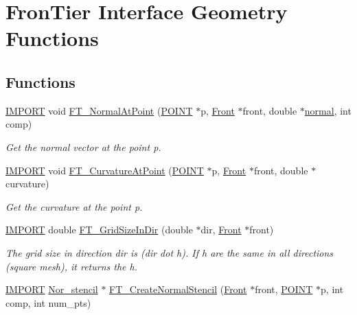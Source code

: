 \hypertarget{group___g_e_o_m_e_t_r_y}{}\section{Fron\+Tier Interface Geometry Functions}
\label{group___g_e_o_m_e_t_r_y}
\subsection*{Functions}
\begin{DoxyCompactItemize}
\item 
\hyperlink{cdecs_8h_a773175d74e73776d69c3e538f17de1ee}{I\+M\+P\+O\+RT} void \hyperlink{group___g_e_o_m_e_t_r_y_ga062c15ef32cddf4e3afb55253a3b8cd1}{F\+T\+\_\+\+Normal\+At\+Point} (\hyperlink{int_8h_a3a87c5c9d0146e30a4bf720f701e5a63}{P\+O\+I\+NT} $\ast$p, \hyperlink{fdecs_8h_ac32202b798f848095c489cfd04c4ca5f}{Front} $\ast$front, double $\ast$\hyperlink{fuserhooks_8c_a92beb80674cd0d86b6bcad12c062da8f}{normal}, int comp)
\begin{DoxyCompactList}\small\item\em Get the normal vector at the point p. \end{DoxyCompactList}\item 
\hyperlink{cdecs_8h_a773175d74e73776d69c3e538f17de1ee}{I\+M\+P\+O\+RT} void \hyperlink{group___g_e_o_m_e_t_r_y_ga2a51e60553765389dc0450e69262c6e5}{F\+T\+\_\+\+Curvature\+At\+Point} (\hyperlink{int_8h_a3a87c5c9d0146e30a4bf720f701e5a63}{P\+O\+I\+NT} $\ast$p, \hyperlink{fdecs_8h_ac32202b798f848095c489cfd04c4ca5f}{Front} $\ast$front, double $\ast$curvature)
\begin{DoxyCompactList}\small\item\em Get the curvature at the point p. \end{DoxyCompactList}\item 
\hyperlink{cdecs_8h_a773175d74e73776d69c3e538f17de1ee}{I\+M\+P\+O\+RT} double \hyperlink{group___g_e_o_m_e_t_r_y_gaf8d4ea1b2375af651d0e98da238eb418}{F\+T\+\_\+\+Grid\+Size\+In\+Dir} (double $\ast$dir, \hyperlink{fdecs_8h_ac32202b798f848095c489cfd04c4ca5f}{Front} $\ast$front)
\begin{DoxyCompactList}\small\item\em The grid size in direction dir is (dir dot h). If h are the same in all directions (square mesh), it returns the h. \end{DoxyCompactList}\item 
\hyperlink{cdecs_8h_a773175d74e73776d69c3e538f17de1ee}{I\+M\+P\+O\+RT} \hyperlink{fdecs_8h_a12a7b755de9f809f15bb18c3212eee18}{Nor\+\_\+stencil} $\ast$ \hyperlink{group___g_e_o_m_e_t_r_y_ga2154d670e36c43759fa37724a3890d96}{F\+T\+\_\+\+Create\+Normal\+Stencil} (\hyperlink{fdecs_8h_ac32202b798f848095c489cfd04c4ca5f}{Front} $\ast$front, \hyperlink{int_8h_a3a87c5c9d0146e30a4bf720f701e5a63}{P\+O\+I\+NT} $\ast$p, int comp, int num\+\_\+pts)

\end{DoxyCompactItemize}

